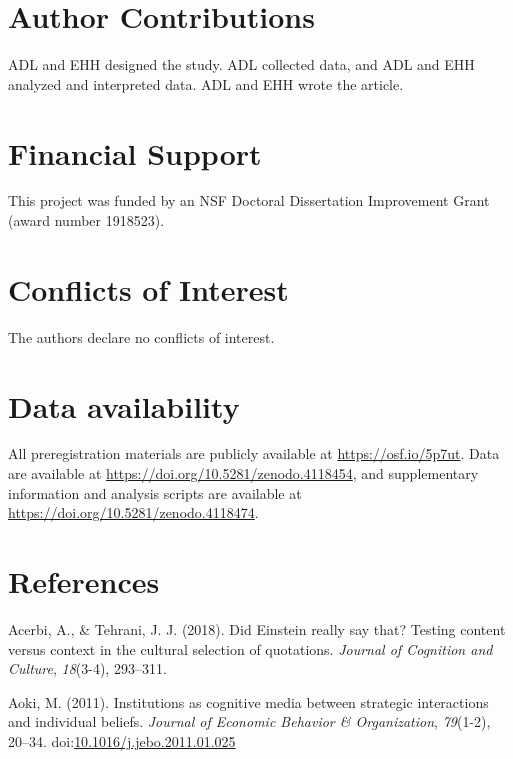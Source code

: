 \documentclass[
  11pt,
]{article}
\begin{document}
\hypertarget{author-contributions}{%
\section{Author Contributions}\label{author-contributions}}

ADL and EHH designed the study. ADL collected data, and ADL and EHH
analyzed and interpreted data. ADL and EHH wrote the article.

\hypertarget{financial-support}{%
\section{Financial Support}\label{financial-support}}

This project was funded by an NSF Doctoral Dissertation Improvement
Grant (award number 1918523).

\hypertarget{conflicts-of-interest}{%
\section{Conflicts of Interest}\label{conflicts-of-interest}}

The authors declare no conflicts of interest.

\hypertarget{data-availability}{%
\section{Data availability}\label{data-availability}}

All preregistration materials are publicly available at
\url{https://osf.io/5p7ut}. Data are available at
\url{https://doi.org/10.5281/zenodo.4118454}, and supplementary
information and analysis scripts are available at
\url{https://doi.org/10.5281/zenodo.4118474}.

\newpage

\hypertarget{references}{%
\section*{References}\label{references}}

\hypertarget{refs}{}
\leavevmode\hypertarget{ref-2018_JOCCC}{}%
Acerbi, A., \& Tehrani, J. J. (2018). Did Einstein really say that?
Testing content versus context in the cultural selection of quotations.
\emph{Journal of Cognition and Culture}, \emph{18}(3-4), 293--311.

\leavevmode\hypertarget{ref-aokiInstitutionsCognitiveMedia2011}{}%
Aoki, M. (2011). Institutions as cognitive media between strategic
interactions and individual beliefs. \emph{Journal of Economic Behavior
\& Organization}, \emph{79}(1-2), 20--34.
doi:\href{https://doi.org/10.1016/j.jebo.2011.01.025}{10.1016/j.jebo.2011.01.025}
\end{document}
